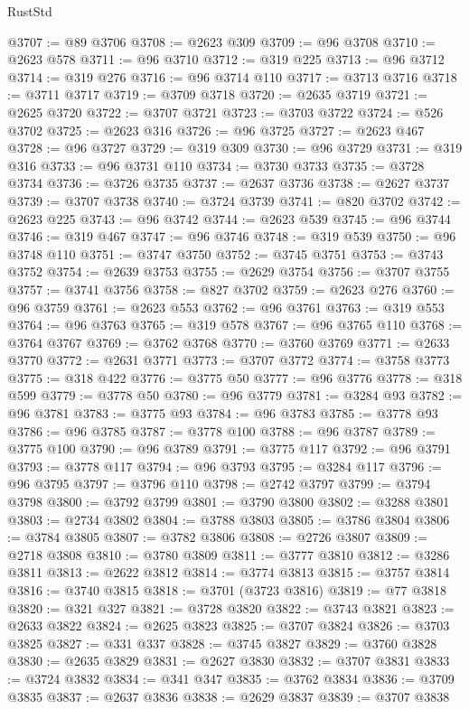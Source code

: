 \begin{lexlean}{RustStd}
\begin{coremodule}
{\begin{coremodule}
{{{{{{{{{{{{{{{{{{{{{{{{{{{{{{{{{{{{{{{{{{{{{{{{{{{{{{{{{{{{@3707 := @89 @3706
@3708 := @2623 @309
@3709 := @96 @3708
@3710 := @2623 @578
@3711 := @96 @3710
@3712 := @319 @225
@3713 := @96 @3712
@3714 := @319 @276
@3716 := @96 @3714 @110
@3717 := @3713 @3716
@3718 := @3711 @3717
@3719 := @3709 @3718
@3720 := @2635 @3719
@3721 := @2625 @3720
@3722 := @3707 @3721
@3723 := @3703 @3722
@3724 := @526 @3702
@3725 := @2623 @316
@3726 := @96 @3725
@3727 := @2623 @467
@3728 := @96 @3727
@3729 := @319 @309
@3730 := @96 @3729
@3731 := @319 @316
@3733 := @96 @3731 @110
@3734 := @3730 @3733
@3735 := @3728 @3734
@3736 := @3726 @3735
@3737 := @2637 @3736
@3738 := @2627 @3737
@3739 := @3707 @3738
@3740 := @3724 @3739
@3741 := @820 @3702
@3742 := @2623 @225
@3743 := @96 @3742
@3744 := @2623 @539
@3745 := @96 @3744
@3746 := @319 @467
@3747 := @96 @3746
@3748 := @319 @539
@3750 := @96 @3748 @110
@3751 := @3747 @3750
@3752 := @3745 @3751
@3753 := @3743 @3752
@3754 := @2639 @3753
@3755 := @2629 @3754
@3756 := @3707 @3755
@3757 := @3741 @3756
@3758 := @827 @3702
@3759 := @2623 @276
@3760 := @96 @3759
@3761 := @2623 @553
@3762 := @96 @3761
@3763 := @319 @553
@3764 := @96 @3763
@3765 := @319 @578
@3767 := @96 @3765 @110
@3768 := @3764 @3767
@3769 := @3762 @3768
@3770 := @3760 @3769
@3771 := @2633 @3770
@3772 := @2631 @3771
@3773 := @3707 @3772
@3774 := @3758 @3773
@3775 := @318 @422
@3776 := @3775 @50
@3777 := @96 @3776
@3778 := @318 @599
@3779 := @3778 @50
@3780 := @96 @3779
@3781 := @3284 @93
@3782 := @96 @3781
@3783 := @3775 @93
@3784 := @96 @3783
@3785 := @3778 @93
@3786 := @96 @3785
@3787 := @3778 @100
@3788 := @96 @3787
@3789 := @3775 @100
@3790 := @96 @3789
@3791 := @3775 @117
@3792 := @96 @3791
@3793 := @3778 @117
@3794 := @96 @3793
@3795 := @3284 @117
@3796 := @96 @3795
@3797 := @3796 @110
@3798 := @2742 @3797
@3799 := @3794 @3798
@3800 := @3792 @3799
@3801 := @3790 @3800
@3802 := @3288 @3801
@3803 := @2734 @3802
@3804 := @3788 @3803
@3805 := @3786 @3804
@3806 := @3784 @3805
@3807 := @3782 @3806
@3808 := @2726 @3807
@3809 := @2718 @3808
@3810 := @3780 @3809
@3811 := @3777 @3810
@3812 := @3286 @3811
@3813 := @2622 @3812
@3814 := @3774 @3813
@3815 := @3757 @3814
@3816 := @3740 @3815
@3818 := @3701 (@3723 @3816)
@3819 := @77 @3818
@3820 := @321 @327
@3821 := @3728 @3820
@3822 := @3743 @3821
@3823 := @2633 @3822
@3824 := @2625 @3823
@3825 := @3707 @3824
@3826 := @3703 @3825
@3827 := @331 @337
@3828 := @3745 @3827
@3829 := @3760 @3828
@3830 := @2635 @3829
@3831 := @2627 @3830
@3832 := @3707 @3831
@3833 := @3724 @3832
@3834 := @341 @347
@3835 := @3762 @3834
@3836 := @3709 @3835
@3837 := @2637 @3836
@3838 := @2629 @3837
@3839 := @3707 @3838
}}}}}}}}}}}}}}}}}}}}}}}}}}}}}}}}}}}}}}}}}}}}}}}}}}}}}}}}}}}}
\end{coremodule}}
\end{coremodule}
\end{lexlean}
